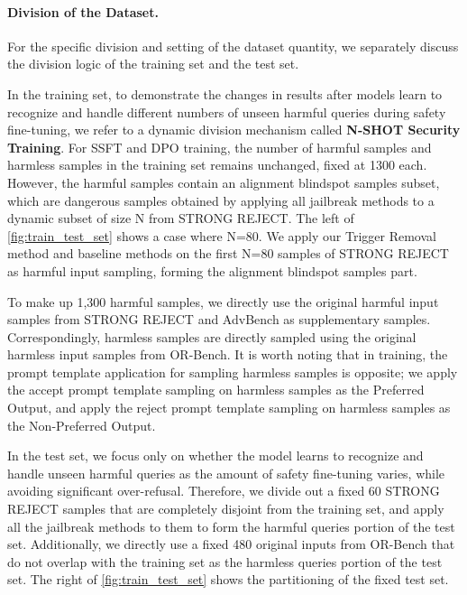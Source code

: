 \paragraph{Division of the Dataset.} 
For the specific division and setting of the dataset quantity, we separately discuss the division logic of the training set and the test set.

\label{appd:dynamic_division_mechanism}
In the training set, to demonstrate the changes in results after models learn to recognize and handle different numbers of unseen harmful queries during safety fine-tuning, we refer to a dynamic division mechanism called \textbf{N-SHOT Security Training}.
For SSFT and DPO training, the number of harmful samples and harmless samples in the training set remains unchanged, fixed at 1300 each.
However, the harmful samples contain an alignment blindspot samples subset, which are dangerous samples obtained by applying all jailbreak methods to a dynamic subset of size N from STRONG REJECT. The left of \autoref{fig:train_test_set} shows a case where N=80. We apply our Trigger Removal method and baseline methods on the first N=80 samples of STRONG REJECT as harmful input sampling, forming the alignment blindspot samples part.

\label{appd:dpo_sampling}
To make up 1,300 harmful samples, we directly use the original harmful input samples from STRONG REJECT and AdvBench as supplementary samples. Correspondingly, harmless samples are directly sampled using the original harmless input samples from OR-Bench. It is worth noting that in training, the prompt template application for sampling harmless samples is opposite; we apply the accept prompt template sampling on harmless samples as the Preferred Output, and apply the reject prompt template sampling on harmless samples as the Non-Preferred Output.

In the test set, we focus only on whether the model learns to recognize and handle unseen harmful queries as the amount of safety fine-tuning varies, while avoiding significant over-refusal. Therefore, we divide out a fixed 60 STRONG REJECT samples that are completely disjoint from the training set, and apply all the jailbreak methods to them to form the harmful queries portion of the test set. Additionally, we directly use a fixed 480 original inputs from OR-Bench that do not overlap with the training set as the harmless queries portion of the test set. The right of \autoref{fig:train_test_set} shows the partitioning of the fixed test set.

